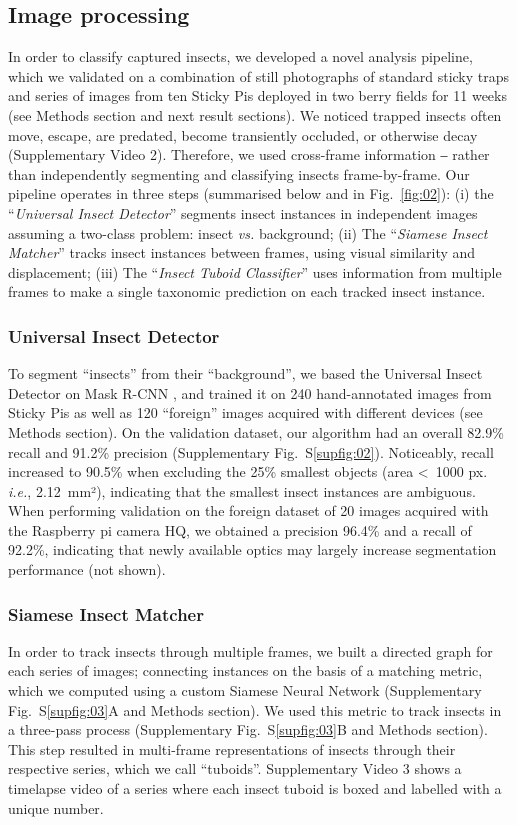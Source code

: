\documentclass[12pt]{article}
\begin{document}
\begin{linenumbers}
		
		\subsection*{Image processing}
		In order to classify captured insects, we developed a novel analysis pipeline, which we validated on a combination of still photographs of standard sticky traps and series of images from ten Sticky Pis deployed in two berry fields for 11 weeks (see Methods section and next result sections). We noticed trapped insects often move, escape, are predated, become transiently occluded, or otherwise decay (Supplementary Video 2). Therefore, we used cross-frame information ‒ rather than independently segmenting and classifying insects frame-by-frame. Our pipeline operates in three steps (summarised below and in Fig.~\ref{fig:02}): 
		(i) the “\emph{Universal Insect Detector}” segments insect instances in independent images assuming a two-class problem: insect \emph{vs.} background;
		(ii) The “\emph{Siamese Insect Matcher}” tracks insect instances between frames, using visual similarity and displacement;
		(iii) The “\emph{Insect Tuboid Classifier}” uses information from multiple frames to make a single taxonomic prediction on each tracked insect instance.
		
		\subsubsection*{Universal Insect Detector}
		To segment “insects” from their “background”, we based the Universal Insect Detector on Mask R-CNN \cite{he_mask_2017}, and trained it on 240 hand-annotated images from Sticky Pis as well as  120 ``foreign'' images acquired with different devices (see Methods section).
		On the validation dataset, our algorithm had an overall 82.9\% recall and 91.2\% precision (Supplementary Fig.~S\ref{supfig:02}). Noticeably, recall increased to 90.5\% when excluding the 25\% smallest objects (area <~1000 px. \emph{i.e.}, 2.12~mm²), indicating that the smallest insect instances are ambiguous.
		When performing validation on the foreign dataset of 20 images acquired with  the Raspberry pi camera HQ, we obtained a precision 96.4\% and a recall of 92.2\%, indicating that newly available optics may largely increase segmentation performance (not shown).
		
		\subsubsection*{Siamese Insect Matcher}
		In order to track insects through multiple frames, we built a directed graph for each series of images; connecting instances on the basis of a matching metric, which we computed using a custom Siamese Neural Network (Supplementary Fig.~S\ref{supfig:03}A and Methods section). We used this metric to track insects in a three-pass process (Supplementary Fig.~S\ref{supfig:03}B and Methods section). This step resulted in multi-frame representations of insects through their respective series, which we call “tuboids”. Supplementary Video 3 shows a timelapse video of a series where each insect tuboid is boxed and labelled with a unique number.
		

\end{linenumbers}
\end{document}

